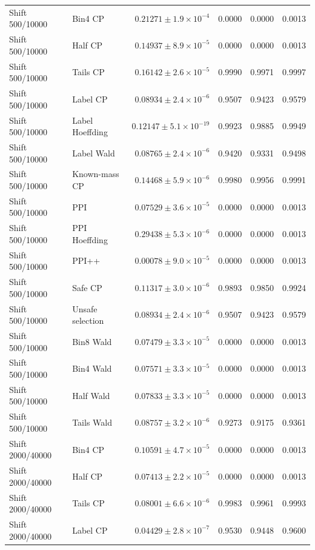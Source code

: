 \begin{longtable}{llrrrr}
Shift 500/10000 & Bin4 CP & $0.21271\pm 1.9\times 10^{-4}$ & 0.0000 & 0.0000 & 0.0013 \\
Shift 500/10000 & Half CP & $0.14937\pm 8.9\times 10^{-5}$ & 0.0000 & 0.0000 & 0.0013 \\
Shift 500/10000 & Tails CP & $0.16142\pm 2.6\times 10^{-5}$ & 0.9990 & 0.9971 & 0.9997 \\
Shift 500/10000 & Label CP & $0.08934\pm 2.4\times 10^{-6}$ & 0.9507 & 0.9423 & 0.9579 \\
Shift 500/10000 & Label Hoeffding & $0.12147\pm 5.1\times 10^{-19}$ & 0.9923 & 0.9885 & 0.9949 \\
Shift 500/10000 & Label Wald & $0.08765\pm 2.4\times 10^{-6}$ & 0.9420 & 0.9331 & 0.9498 \\
Shift 500/10000 & Known-mass CP & $0.14468\pm 5.9\times 10^{-6}$ & 0.9980 & 0.9956 & 0.9991 \\
Shift 500/10000 & PPI & $0.07529\pm 3.6\times 10^{-5}$ & 0.0000 & 0.0000 & 0.0013 \\
Shift 500/10000 & PPI Hoeffding & $0.29438\pm 5.3\times 10^{-6}$ & 0.0000 & 0.0000 & 0.0013 \\
Shift 500/10000 & PPI++ & $0.00078\pm 9.0\times 10^{-5}$ & 0.0000 & 0.0000 & 0.0013 \\
Shift 500/10000 & Safe CP & $0.11317\pm 3.0\times 10^{-6}$ & 0.9893 & 0.9850 & 0.9924 \\
Shift 500/10000 & Unsafe selection & $0.08934\pm 2.4\times 10^{-6}$ & 0.9507 & 0.9423 & 0.9579 \\
Shift 500/10000 & Bin8 Wald & $0.07479\pm 3.3\times 10^{-5}$ & 0.0000 & 0.0000 & 0.0013 \\
Shift 500/10000 & Bin4 Wald & $0.07571\pm 3.3\times 10^{-5}$ & 0.0000 & 0.0000 & 0.0013 \\
Shift 500/10000 & Half Wald & $0.07833\pm 3.3\times 10^{-5}$ & 0.0000 & 0.0000 & 0.0013 \\
Shift 500/10000 & Tails Wald & $0.08757\pm 3.2\times 10^{-6}$ & 0.9273 & 0.9175 & 0.9361 \\
Shift 2000/40000 & Bin4 CP & $0.10591\pm 4.7\times 10^{-5}$ & 0.0000 & 0.0000 & 0.0013 \\
Shift 2000/40000 & Half CP & $0.07413\pm 2.2\times 10^{-5}$ & 0.0000 & 0.0000 & 0.0013 \\
Shift 2000/40000 & Tails CP & $0.08001\pm 6.6\times 10^{-6}$ & 0.9983 & 0.9961 & 0.9993 \\
Shift 2000/40000 & Label CP & $0.04429\pm 2.8\times 10^{-7}$ & 0.9530 & 0.9448 & 0.9600 \\

\end{longtable}
